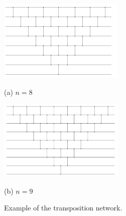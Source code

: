 \documentclass[12pt,a4paper]{article}
\theoremstyle{definition}
\begin{document}
\begin{enumerate}
\begin{figure}
\begin{minipage}{0.5\linewidth}
  \centerline{\includegraphics[width=6.0cm]{Fig-EXAMPLE8.png}}
  \centerline{(a) $n=8$ }
\end{minipage}
\hfill
\begin{minipage}{0.5\linewidth}
  \centerline{\includegraphics[width=6.0cm]{Fig-EXAMPLE9.png}}
  \centerline{(b) $n=9$}
\end{minipage}
\hfill
\caption{Example of the transposition network.}
\label{fig:res}
\end{figure}
\begin{figure}[htbp]
    \centering

\end{figure}
\end{enumerate}
\end{document}
